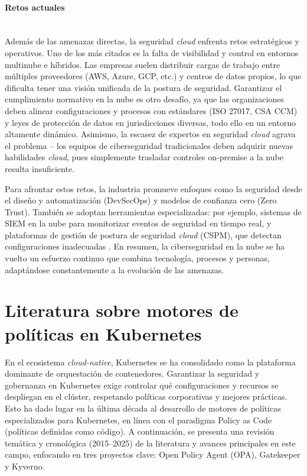 \documentclass[12pt,twoside,titlepage]{report}
\begin{document}
\paragraph{Retos actuales \\ \\}

Además de las amenazas directas, la seguridad \textit{cloud} enfrenta retos estratégicos y operativos. Uno de los más citados es la falta de visibilidad y control en entornos multinube e híbridos. Las empresas suelen distribuir cargas de trabajo entre múltiples proveedores (AWS, Azure, GCP, etc.) y centros de datos propios, lo que dificulta tener una visión unificada de la postura de seguridad. Garantizar el cumplimiento normativo en la nube es otro desafío, ya que las organizaciones deben alinear configuraciones y procesos con estándares (ISO 27017, CSA CCM) y leyes de protección de datos en jurisdicciones diversas, todo ello en un entorno altamente dinámico. Asimismo, la escasez de expertos en seguridad \textit{cloud} agrava el problema – los equipos de ciberseguridad tradicionales deben adquirir nuevas habilidades \textit{cloud}, pues simplemente trasladar controles on-premise a la nube resulta insuficiente.

Para afrontar estos retos, la industria promueve enfoques como la seguridad desde el diseño y automatización (DevSecOps) y modelos de confianza cero (Zero Trust). También se adoptan herramientas especializadas: por ejemplo, sistemas de SIEM en la nube para monitorizar eventos de seguridad en tiempo real, y plataformas de gestión de postura de seguridad \textit{cloud} (CSPM), que detectan configuraciones inadecuadas \cite{li2024cloud}. En resumen, la ciberseguridad en la nube se ha vuelto un esfuerzo continuo que combina tecnología, procesos y personas, adaptándose constantemente a la evolución de las amenazas.


\section{Literatura sobre motores de políticas en Kubernetes}

En el ecosistema \textit{cloud-native}, Kubernetes se ha consolidado como la plataforma dominante de orquestación de contenedores. Garantizar la seguridad y gobernanza en Kubernetes exige controlar qué configuraciones y recursos se despliegan en el clúster, respetando políticas corporativas y mejores prácticas. Esto ha dado lugar en la última década al desarrollo de motores de políticas especializados para Kubernetes, en línea con el paradigma Policy as Code (políticas definidas como código). A continuación, se presenta una revisión temática y cronológica (2015–2025) de la literatura y avances principales en este campo, enfocando en tres proyectos clave: Open Policy Agent (OPA), Gatekeeper y Kyverno. 
\end{document}
